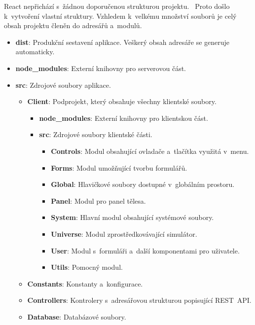 \documentclass[a4paper,12pt]{article}
\begin{document}
React nepřichází s~žádnou doporučenou strukturou projektu.~\cite{filestructure} Proto došlo k~vytvoření vlastní struktury. Vzhledem k~velkému množství souborů je celý obsah projektu členěn do adresářů a~modulů.

\begin{itemize}
\item \textbf{dist}: Produkční sestavení aplikace. Veškerý obsah adresáře se generuje automaticky.
\item \textbf{node\_modules}: Externí knihovny pro serverovou část.
\item \textbf{src}: Zdrojové soubory aplikace.

\begin{itemize}
\item \textbf{Client}: Podprojekt, který obsahuje všechny klientské soubory.

\begin{itemize}
\item \textbf{node\_modules}: Externí knihovny pro klientskou část.
\item \textbf{src}:  Zdrojové soubory klientské části.

\begin{itemize}
\item \textbf{Controls}: Modul obsahující ovladače a~tlačítka využitá v~menu.
\item \textbf{Forms}: Modul umožňující tvorbu formulářů.
\item \textbf{Global}: Hlavičkové soubory dostupné v~globálním prostoru.
\item \textbf{Panel}: Modul pro panel tělesa.
\item \textbf{System}: Hlavní modul obsahující systémové soubory.
\item \textbf{Universe}: Modul zprostředkovávající simulátor.
\item \textbf{User}: Modul s~formuláři a~další komponentami pro uživatele.
\item \textbf{Utils}: Pomocný modul.
\end{itemize} 

\end{itemize} 

\item \textbf{Constants}: Konstanty a~konfigurace.
\item \textbf{Controllers}: Kontrolery s~adresářovou strukturou popisující REST~API.
\item \textbf{Database}: Databázové soubory.


\end{itemize}
\end{itemize}
\end{document}
